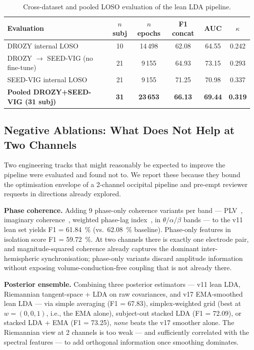 \documentclass[journal]{IEEEtran}
\DeclareRobustCommand{\add}[1]{#1}                         %
\DeclareRobustCommand{\del}[1]{}                           %
\DeclareRobustCommand{\add}[1]{\hl{#1}}
\DeclareRobustCommand{\del}[1]{{\color{delred}\sout{#1}}\,}
\DeclareRobustCommand{\del}[1]{}                         %
\DeclareRobustCommand{\chg}[2]{\del{#1}\add{#2}}
\begin{document}
\begin{table}[t]
\caption{Cross-dataset and pooled LOSO evaluation of the lean LDA pipeline.}
\label{tab:cross}
\centering
\small
\setlength{\tabcolsep}{3pt}
\begin{tabular}{l c c c c c}
\toprule
Evaluation                       & \(n\) subj & \(n\) epochs & F1 concat & AUC & \(\kappa\) \\
\midrule
DROZY internal LOSO              & 10 & 14\,498 & 62.08 & 64.55 & 0.242 \\
DROZY \(\to\) SEED-VIG (no fine-tune) & 21 & 9\,155 & 64.93 & 73.15 & 0.293 \\
SEED-VIG internal LOSO           & 21 & 9\,155 & 71.25 & 70.98 & 0.337 \\
\textbf{Pooled DROZY+SEED-VIG (31 subj)} & \textbf{31} & \textbf{23\,653} & \textbf{66.13} & \textbf{69.44} & \textbf{0.319} \\
\bottomrule
\end{tabular}
\end{table}

\subsection{\chg{Negative Ablations}{Negative Ablations: What Does Not Help at Two Channels}}
\label{sec:negative}
Two engineering tracks that might reasonably be expected to improve the pipeline were evaluated and found not to. We report these because they bound the optimisation envelope of a 2-channel occipital pipeline and pre-empt reviewer requests in directions already explored.

\textbf{Phase coherence.} Adding 9 phase-only coherence variants per band --- PLV~\cite{lachaux1999plv}, imaginary coherence~\cite{nolte2004imcoh}, weighted phase-lag index~\cite{vinck2011wpli}, in \(\theta/\alpha/\beta\) bands --- to the v11 lean set yields F1 = 61.84~\% (vs.\ 62.08~\% baseline). Phase-only features in isolation score F1 = 59.72~\%. At two channels there is exactly one electrode pair, and magnitude-squared coherence already captures the dominant inter-hemispheric synchronisation; phase-only variants discard amplitude information without exposing volume-conduction-free coupling that is not already there.

\textbf{Posterior ensemble.} Combining three posterior estimators --- v11 lean LDA, Riemannian tangent-space + LDA on raw covariances, and v17 EMA-smoothed lean LDA --- via simple averaging (F1 = 67.83), simplex-weighted grid (best at \(w = (0,0,1)\), i.e., the EMA alone), subject-out stacked LDA (F1 = 72.09), or stacked LDA + EMA (F1 = 73.25), \emph{none} beats the v17 smoother alone. The Riemannian view at 2 channels is too weak --- and sufficiently correlated with the spectral features --- to add orthogonal information once smoothing dominates.
\end{document}
